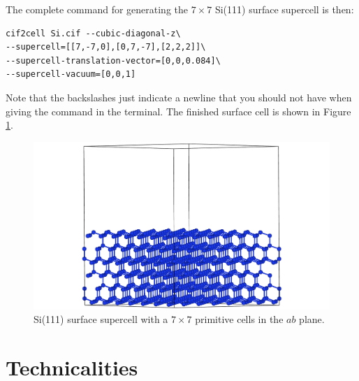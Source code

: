 \documentclass[11pt]{article}
\begin{document}
The complete command for generating the $7\times7$ Si(111) surface supercell is then:
\begin{Verbatim}[fontsize=\small]
cif2cell Si.cif --cubic-diagonal-z\
--supercell=[[7,-7,0],[0,7,-7],[2,2,2]]\
--supercell-translation-vector=[0,0,0.084]\
--supercell-vacuum=[0,0,1]
\end{Verbatim}
Note that the backslashes just indicate a newline that you should not have when giving the command in the terminal. The finished surface cell is shown in Figure \ref{surfSi}.

\begin{figure}[htbp] %
   \centering
   \includegraphics[width=\textwidth]{Si_surf.png} 
   \caption{Si(111) surface supercell with a $7\times7$ primitive cells in the $ab$ plane.}
   \label{surfSi}
\end{figure}



\newpage
\appendix
\section{Technicalities}\label{techappendix}
\end{document}
